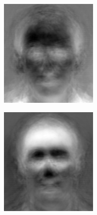 \begin{figure}
\begin{subfigure}[b]{0.3\textwidth}
\includegraphics[width=\textwidth]{figures/eigenface0.png}
\end{subfigure}
\begin{subfigure}[b]{0.3\textwidth}
\includegraphics[width=\textwidth]{figures/eigenface1.png}

\end{subfigure}
\end{figure}

